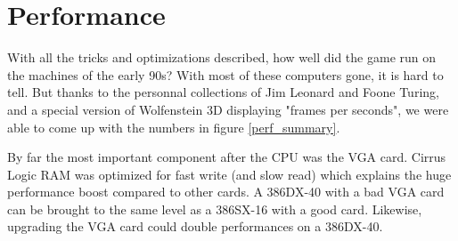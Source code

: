 \section{Performance}
With all the tricks and optimizations described, how well did the game run on the machines of the early 90s? With most of these computers gone, it is hard to tell. But thanks to the personnal collections of Jim Leonard and Foone Turing, and a special version of Wolfenstein 3D displaying "frames per seconds", we were able to come up with the numbers in figure \ref{perf_summary}.\\
\par
By far the most important component after the CPU was the VGA card. Cirrus Logic RAM was optimized for fast write (and slow read) which explains the huge performance boost compared to other cards. A 386DX-40 with a bad VGA card can be brought to the same level as a 386SX-16 with a good card. Likewise, upgrading the VGA card could double performances on a 386DX-40.\\ 
\par

